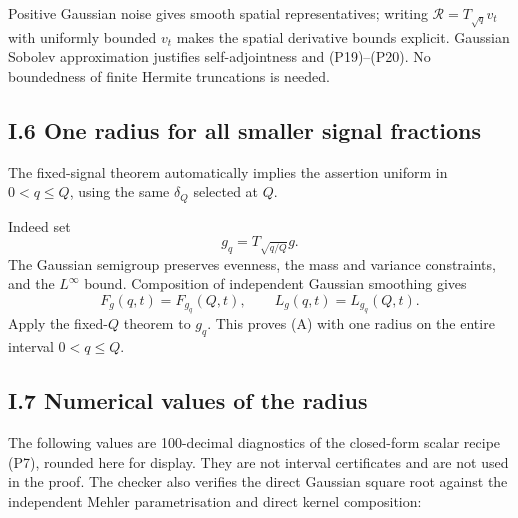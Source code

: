 \documentclass[
  british,
  10pt,
]{article}
\begin{document}
Positive Gaussian noise gives smooth spatial representatives; writing
\(\mathcal R=T_{\sqrt q}v_t\) with uniformly bounded \(v_t\) makes the
spatial derivative bounds explicit. Gaussian Sobolev approximation
justifies self-adjointness and (P19)--(P20). No boundedness of finite
Hermite truncations is needed.

\subsection{I.6 One radius for all smaller signal
fractions}\label{i.6-one-radius-for-all-smaller-signal-fractions}

The fixed-signal theorem automatically implies the assertion uniform in
\(0<q\le Q\), using the same \(\delta_Q\) selected at \(Q\).

Indeed set \[
g_q=T_{\sqrt{q/Q}}g.
\] The Gaussian semigroup preserves evenness, the mass and variance
constraints, and the \(L^\infty\) bound. Composition of independent
Gaussian smoothing gives \[
F_g(q,t)=F_{g_q}(Q,t),\qquad
L_g(q,t)=L_{g_q}(Q,t).
\] Apply the fixed-\(Q\) theorem to \(g_q\). This proves (A) with one
radius on the entire interval \(0<q\le Q\).

\subsection{I.7 Numerical values of the
radius}\label{i.7-numerical-values-of-the-radius}

The following values are 100-decimal diagnostics of the closed-form
scalar recipe (P7), rounded here for display. They are not interval
certificates and are not used in the proof. The checker also verifies
the direct Gaussian square root against the independent Mehler
parametrisation and direct kernel composition:
\end{document}
